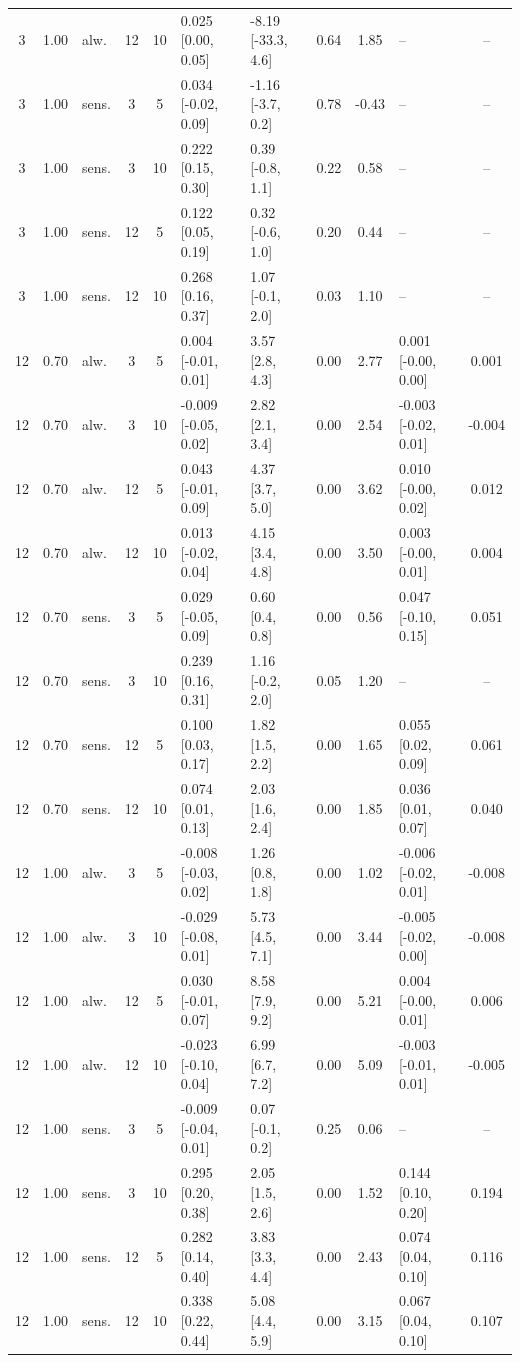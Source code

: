 \begin{scriptsize}
\begin{longtable}{cclcc l l c c l c}
3 & 1.00 & alw. & 12 & 10 & 0.025 [0.00, 0.05] & -8.19 [-33.3, 4.6] & 0.64 & 1.85 & -- & -- \\
3 & 1.00 & sens. & 3 & 5 & 0.034 [-0.02, 0.09] & -1.16 [-3.7, 0.2] & 0.78 & -0.43 & -- & -- \\
3 & 1.00 & sens. & 3 & 10 & 0.222 [0.15, 0.30] & 0.39 [-0.8, 1.1] & 0.22 & 0.58 & -- & -- \\
3 & 1.00 & sens. & 12 & 5 & 0.122 [0.05, 0.19] & 0.32 [-0.6, 1.0] & 0.20 & 0.44 & -- & -- \\
3 & 1.00 & sens. & 12 & 10 & 0.268 [0.16, 0.37] & 1.07 [-0.1, 2.0] & 0.03 & 1.10 & -- & -- \\
12 & 0.70 & alw. & 3 & 5 & 0.004 [-0.01, 0.01] & 3.57 [2.8, 4.3] & 0.00 & 2.77 & 0.001 [-0.00, 0.00] & 0.001 \\
12 & 0.70 & alw. & 3 & 10 & -0.009 [-0.05, 0.02] & 2.82 [2.1, 3.4] & 0.00 & 2.54 & -0.003 [-0.02, 0.01] & -0.004 \\
12 & 0.70 & alw. & 12 & 5 & 0.043 [-0.01, 0.09] & 4.37 [3.7, 5.0] & 0.00 & 3.62 & 0.010 [-0.00, 0.02] & 0.012 \\
12 & 0.70 & alw. & 12 & 10 & 0.013 [-0.02, 0.04] & 4.15 [3.4, 4.8] & 0.00 & 3.50 & 0.003 [-0.00, 0.01] & 0.004 \\
12 & 0.70 & sens. & 3 & 5 & 0.029 [-0.05, 0.09] & 0.60 [0.4, 0.8] & 0.00 & 0.56 & 0.047 [-0.10, 0.15] & 0.051 \\
12 & 0.70 & sens. & 3 & 10 & 0.239 [0.16, 0.31] & 1.16 [-0.2, 2.0] & 0.05 & 1.20 & -- & -- \\
12 & 0.70 & sens. & 12 & 5 & 0.100 [0.03, 0.17] & 1.82 [1.5, 2.2] & 0.00 & 1.65 & 0.055 [0.02, 0.09] & 0.061 \\
12 & 0.70 & sens. & 12 & 10 & 0.074 [0.01, 0.13] & 2.03 [1.6, 2.4] & 0.00 & 1.85 & 0.036 [0.01, 0.07] & 0.040 \\
12 & 1.00 & alw. & 3 & 5 & -0.008 [-0.03, 0.02] & 1.26 [0.8, 1.8] & 0.00 & 1.02 & -0.006 [-0.02, 0.01] & -0.008 \\
12 & 1.00 & alw. & 3 & 10 & -0.029 [-0.08, 0.01] & 5.73 [4.5, 7.1] & 0.00 & 3.44 & -0.005 [-0.02, 0.00] & -0.008 \\
12 & 1.00 & alw. & 12 & 5 & 0.030 [-0.01, 0.07] & 8.58 [7.9, 9.2] & 0.00 & 5.21 & 0.004 [-0.00, 0.01] & 0.006 \\
12 & 1.00 & alw. & 12 & 10 & -0.023 [-0.10, 0.04] & 6.99 [6.7, 7.2] & 0.00 & 5.09 & -0.003 [-0.01, 0.01] & -0.005 \\
12 & 1.00 & sens. & 3 & 5 & -0.009 [-0.04, 0.01] & 0.07 [-0.1, 0.2] & 0.25 & 0.06 & -- & -- \\
12 & 1.00 & sens. & 3 & 10 & 0.295 [0.20, 0.38] & 2.05 [1.5, 2.6] & 0.00 & 1.52 & 0.144 [0.10, 0.20] & 0.194 \\
12 & 1.00 & sens. & 12 & 5 & 0.282 [0.14, 0.40] & 3.83 [3.3, 4.4] & 0.00 & 2.43 & 0.074 [0.04, 0.10] & 0.116 \\
12 & 1.00 & sens. & 12 & 10 & 0.338 [0.22, 0.44] & 5.08 [4.4, 5.9] & 0.00 & 3.15 & 0.067 [0.04, 0.10] & 0.107 \\
\end{longtable}
\end{scriptsize}